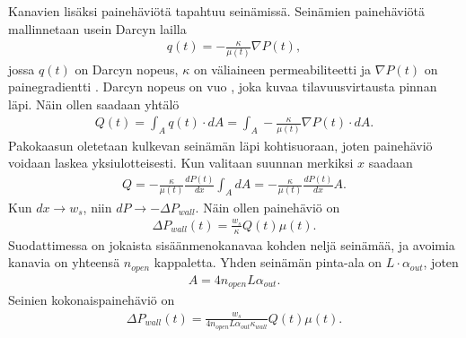 Kanavien lisäksi painehäviötä tapahtuu seinämissä. Seinämien painehäviötä mallinnetaan usein Darcyn lailla \cite{dieselnet_wall_flow_monolith}\cite{Konstandopoulos1989_wallflow}
\begin{align}
    q(t) = - \frac{\kappa}{\mu(t)}\nabla P(t),
\end{align}
jossa \(q(t)\) on Darcyn nopeus, \(\kappa\) on väliaineen permeabiliteetti ja \(\nabla P(t)\) on painegradientti \cite{feder2021_porous}. 
 Darcyn nopeus on vuo \cite{reible_env_eng}, joka kuvaa tilavuusvirtausta pinnan läpi. Näin ollen saadaan yhtälö
\begin{align}
    Q(t) = \int_A q(t) \cdot dA = \int_A - \frac{\kappa}{\mu(t)} \nabla P(t) \cdot dA.
\end{align}
Pakokaasun oletetaan kulkevan seinämän läpi kohtisuoraan, joten painehäviö voidaan laskea yksiulotteisesti. Kun valitaan suunnan merkiksi \(x\) saadaan
\begin{align}
    Q = - \frac{\kappa}{\mu(t)} \frac{dP(t)}{dx} \int_A dA = - \frac{\kappa}{\mu(t)} \frac{dP(t)}{dx} A.
\end{align}
Kun \(dx \to w_s\), niin \(dP \to -\Delta P_{wall}\). Näin ollen painehäviö on
\begin{align}
    \Delta P_{wall}(t) =  \frac{w_s}{\kappa}Q(t)\mu(t).
\end{align}
Suodattimessa on jokaista sisäänmenokanavaa kohden neljä seinämää, ja avoimia kanavia on yhteensä \(n_{open}\) kappaletta. Yhden seinämän pinta-ala on \(L\cdot \alpha_{out}\), joten 
\begin{align}
    A = 4 n_{open} L \alpha_{out}.
\end{align}
Seinien kokonaispainehäviö on
\begin{align}
    \Delta P_{wall}(t) =   \frac{w_s}{4 n_{open} L  \alpha_{out}  \kappa_{wall}}Q(t) \mu(t).
\end{align}

